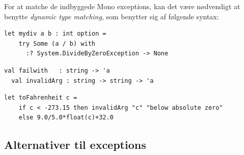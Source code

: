 \documentclass[rgb]{beamer}
\begin{document}
\begin{frame}[fragile]
\begin{footnotesize}


  For at matche de indbyggede Mono exceptions, kan det være nødvendigt at
  benytte \emph{dynamic type matching}, som benytter sig af følgende
  syntax:

\begin{lstlisting}[numbers=none,frame=none]
  let mydiv a b : int option =
    try Some (a / b) with
      :? System.DivideByZeroException -> None
\end{lstlisting}

\vspace{1ex}

\begin{lstlisting}[numbers=none,frame=none]
  val failwith   : string -> 'a
  val invalidArg : string -> string -> 'a
\end{lstlisting}


\vspace{1ex}
\begin{lstlisting}[numbers=none,frame=none,mathescape]
  let toFahrenheit c =
    if c < -273.15 then invalidArg "c" "below absolute zero"
    else 9.0/5.0*float(c)+32.0
\end{lstlisting}

\end{footnotesize}
\end{frame}

\subsection{Alternativer til exceptions}
\end{document}
